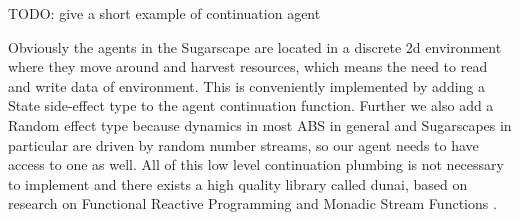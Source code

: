 \begin{HaskellCode}
TODO: give a short example of continuation agent
\end{HaskellCode}

Obviously the agents in the Sugarscape are located in a discrete 2d environment where they move around and harvest resources, which means the need to read and write data of environment. This is conveniently implemented by adding a State side-effect type to the agent continuation function. Further we also add a Random effect type because dynamics in most ABS in general and Sugarscapes in particular are driven by random number streams, so our agent needs to have access to one as well. All of this low level continuation plumbing is not necessary to implement and there exists a high quality library called dunai, based on research on Functional Reactive Programming  \cite{hudak_arrows_2003} and Monadic Stream Functions \cite{perez_functional_2016,perez_extensible_2017}.